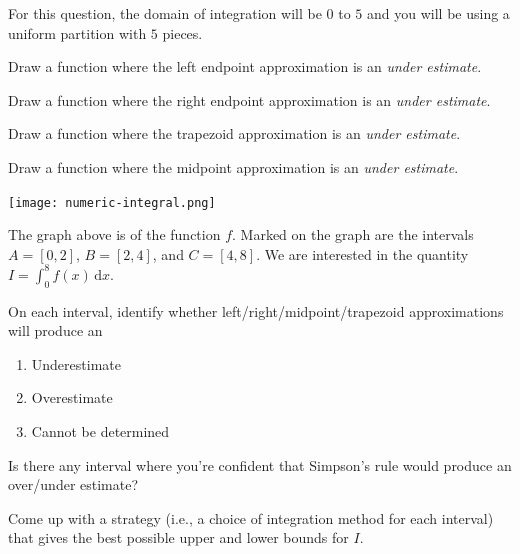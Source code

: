 \documentclass{workbook}
\begin{document}
\begin{slide}
	\question
	For this question, the domain of integration will be $0$ to $5$ and you will
	be using a uniform partition with $5$ pieces.

	\begin{parts}
		\item Draw a function where the left endpoint approximation is an \emph{under estimate}.

		\item Draw a function where the right endpoint approximation is an \emph{under estimate}.

		\item Draw a function where the trapezoid approximation is an \emph{under estimate}.

		\item Draw a function where the midpoint approximation is an \emph{under estimate}.

	\end{parts}
\end{slide}


\begin{slide}
	\question

	\texttt{[image: numeric-integral.png]}

	The graph above is of the function $f$. Marked on the graph are the intervals
	$A=[0,2]$, $B=[2,4]$, and $C=[4,8]$. We are interested in the quantity $\displaystyle I=\int_0^8 f(x)\,\mathrm d x$.
	\begin{parts}
		\item On each interval, identify whether left/right/midpoint/trapezoid approximations will produce an
		\begin{enumerate}
			\item Underestimate
			\item Overestimate
			\item Cannot be determined
		\end{enumerate}

		\item Is there any interval where you're confident that Simpson's rule would produce
		an over/under estimate?

		\item Come up with a strategy (i.e., a choice of integration method for each interval)
		that gives the best possible upper and lower bounds for $I$.

	\end{parts}
\end{slide}
\end{document}
